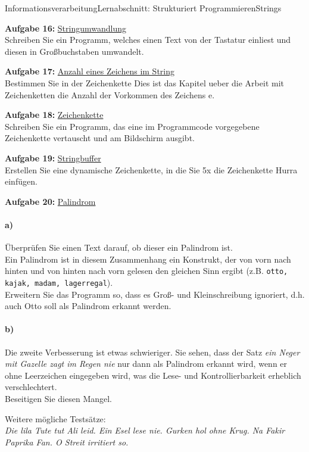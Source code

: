 \documentclass[oneside,openany,headings=optiontotoc,11pt,numbers=noenddot]{scrreprt}
\begin{document}
	\begin{worksheet}{Informationsverarbeitung}{Lernabschnitt: Strukturiert Programmieren}{Strings}
		\noindent
		\sffamily
		\begin{framed}
			\noindent
			\textbf{Aufgabe 16:} \underline{Stringumwandlung}\\
			Schreiben Sie ein Programm, welches einen Text von der Tastatur einliest und diesen in Großbuchstaben umwandelt.\\
			\par\noindent
			\textbf{Aufgabe 17:} \underline{Anzahl eines Zeichens im String}\\
			Bestimmen Sie in der Zeichenkette \grqq{}Dies ist das Kapitel ueber die Arbeit mit Zeichenketten\grqq{} die Anzahl der Vorkommen des Zeichens \grq{}e\grq{}.\\
			\par\noindent
			\textbf{Aufgabe 18:} \underline{Zeichenkette}\\
			Schreiben Sie ein Programm, das eine im Programmcode vorgegebene Zeichenkette vertauscht und am Bildschirm ausgibt.\\
			\par\noindent
			\textbf{Aufgabe 19:} \underline{Stringbuffer}\\
			Erstellen Sie eine dynamische Zeichenkette, in die Sie 5x die Zeichenkette \grqq{}Hurra\grqq{} einfügen.\\
			\par\noindent
			\textbf{Aufgabe 20:} \underline{Palindrom}
			\paragraph{a)} Überprüfen Sie einen Text darauf, ob dieser ein Palindrom ist.\\
			Ein Palindrom ist in diesem Zusammenhang ein Konstrukt, der von vorn nach hinten und von hinten nach vorn gelesen den gleichen Sinn ergibt (z.B. \texttt{otto, kajak, madam, lagerregal}).\\
			Erweitern Sie das Programm so, dass es Groß- und Kleinschreibung ignoriert, d.h. auch Otto soll als Palindrom erkannt werden.
			\paragraph{b)} Die zweite Verbesserung ist etwas schwieriger. Sie sehen, dass der Satz \textit{ein Neger mit Gazelle zagt im Regen nie} nur dann als Palindrom erkannt wird, wenn er ohne Leerzeichen eingegeben wird, was die Lese- und Kontrollierbarkeit erheblich verschlechtert.\\
			Beseitigen Sie diesen Mangel.\\
			\par\noindent
			Weitere mögliche Testsätze:\\
			\textit{Die lila Tute tut Ali leid. Ein Esel lese nie. Gurken hol ohne Krug. Na Fakir Paprika Fan. O Streit irritiert so.}
		\end{framed}
	\end{worksheet}
\end{document}
